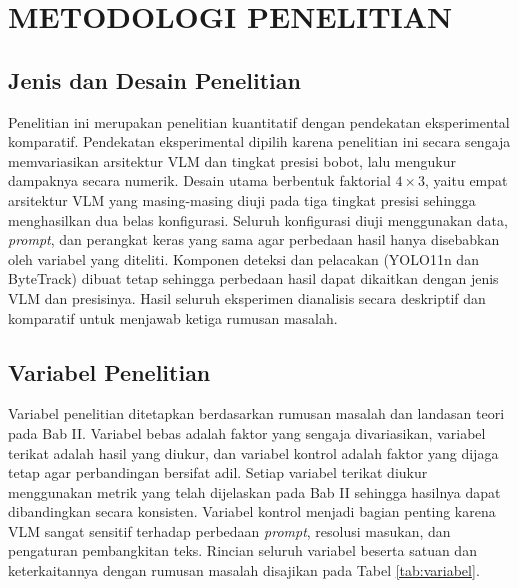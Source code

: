 \chapter{METODOLOGI PENELITIAN}

\section{Jenis dan Desain Penelitian}
Penelitian ini merupakan penelitian kuantitatif dengan pendekatan eksperimental komparatif. Pendekatan eksperimental dipilih karena penelitian ini secara sengaja memvariasikan arsitektur VLM dan tingkat presisi bobot, lalu mengukur dampaknya secara numerik. Desain utama berbentuk faktorial $4 \times 3$, yaitu empat arsitektur VLM yang masing-masing diuji pada tiga tingkat presisi sehingga menghasilkan dua belas konfigurasi. Seluruh konfigurasi diuji menggunakan data, \textit{prompt}, dan perangkat keras yang sama agar perbedaan hasil hanya disebabkan oleh variabel yang diteliti. Komponen deteksi dan pelacakan (YOLO11n dan ByteTrack) dibuat tetap sehingga perbedaan hasil dapat dikaitkan dengan jenis VLM dan presisinya. Hasil seluruh eksperimen dianalisis secara deskriptif dan komparatif untuk menjawab ketiga rumusan masalah.

\section{Variabel Penelitian}
Variabel penelitian ditetapkan berdasarkan rumusan masalah dan landasan teori pada Bab II. Variabel bebas adalah faktor yang sengaja divariasikan, variabel terikat adalah hasil yang diukur, dan variabel kontrol adalah faktor yang dijaga tetap agar perbandingan bersifat adil. Setiap variabel terikat diukur menggunakan metrik yang telah dijelaskan pada Bab II sehingga hasilnya dapat dibandingkan secara konsisten. Variabel kontrol menjadi bagian penting karena VLM sangat sensitif terhadap perbedaan \textit{prompt}, resolusi masukan, dan pengaturan pembangkitan teks. Rincian seluruh variabel beserta satuan dan keterkaitannya dengan rumusan masalah disajikan pada Tabel \ref{tab:variabel}.

